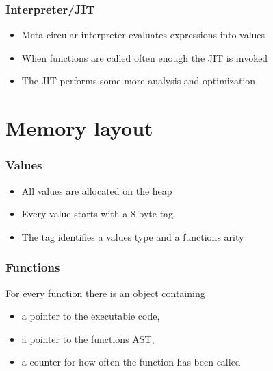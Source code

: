 \documentclass{beamer}
\begin{document}
	\begin{frame}
		\frametitle{Interpreter/JIT}

		\begin{itemize}
			\itemsep12pt
		
			\item Meta circular interpreter evaluates expressions into values
			\item When functions are called often enough the JIT is invoked
			\item The JIT performs some more analysis and optimization
		\end{itemize}
	\end{frame}


	\section{Memory layout}


	\begin{frame}
		\frametitle{Values}

		\begin{itemize}
			\itemsep12pt
		
			\item All values are allocated on the heap
			\item Every value starts with a 8 byte tag.
			\item The tag identifies a values type and a functions arity
		\end{itemize}
	\end{frame}

	\begin{frame}
		\frametitle{Functions}

		For every function there is an object containing
		\begin{itemize}
			\itemsep12pt
		
			\item a pointer to the executable code,
			\item a pointer to the functions AST,
			\item a counter for how often the function has been called
		\end{itemize}
	\end{frame}
\end{document}
